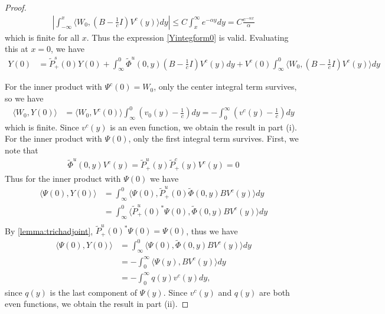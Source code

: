 \documentclass[thesis.tex]{subfiles}
\begin{document}
\begin{lemma}
\begin{proof}
\begin{align*}
\left| \int_{-\infty}^x \langle W_0, \left( B - \frac{1}{c}I \right) V^c(y) \rangle dy \right| 
\leq C \int_x^{\infty} e^{-\alpha y} dy = C \frac{e^{-\alpha x}}{\alpha}
\end{align*}
which is finite for all $x$. Thus the expression \cref{Yintegform0} is valid. Evaluating this at $x = 0$, we have
\begin{equation}\label{Yintegform0}
\begin{aligned}
Y(0) &= \tilde{P}^s_+(0) Y(0) 
+ \int_{\infty}^0 \tilde{\Phi}^u(0,y)\left( B - \frac{1}{c}I \right) V^c(y) dy + V^c(0) \int_{\infty}^0 \langle W_0, \left( B - \frac{1}{c}I \right) V^c(y) \rangle dy 
\end{aligned}
\end{equation}

For the inner product with $\Psi^c(0) = W_0$, only the center integral term survives, so we have
\begin{align*}
\langle W_0, Y(0) \rangle
&= \langle W_0, V^c(0) \rangle \int_{\infty}^0 \left(v_0(y) - \frac{1}{c}\right) dy 
= -\int_0^{\infty} \left(v^c(y) - \frac{1}{c}\right) dy 
\end{align*}
which is finite. Since $v^c(y)$ is an even function, we obtain the result in part (i). For the inner product with $\Psi(0)$, only the first integral term survives. First, we note that 
\begin{align*}
\tilde{\Phi}^u(0,y) V^c(y) = \tilde{P}_+^u(y) \tilde{P}_+^c(y)V^c(y) = 0
\end{align*}
Thus for the inner product with $\Psi(0)$ we have
\begin{align*}
\langle \Psi(0), Y(0) \rangle
&= \int_{\infty}^0 \langle \Psi(0), \tilde{P}_+^u(0) \tilde{\Phi}(0,y) B V^c(y) \rangle dy \\
&= \int_{\infty}^0 \langle \tilde{P}_+^u(0)^*\Psi(0), \tilde{\Phi}(0,y) B V^c(y) \rangle dy \\
\end{align*}
By \cref{lemma:trichadjoint}, $\tilde{P}_+^u(0)^*\Psi(0) = \Psi(0)$, thus we have
\begin{align*}
\langle \Psi(0), Y(0) \rangle
&= \int_{\infty}^0 \langle \Psi(0), \tilde{\Phi}(0,y) B V^c(y) \rangle dy \\
&= -\int_0^\infty \langle \Psi(y), B V^c(y) \rangle dy \\
&=-\int_0^\infty q(y) v^c(y) dy,
\end{align*}
since $q(y)$ is the last component of $\Psi(y)$. Since $v^c(y)$ and $q(y)$ are both even functions, we obtain the result in part (ii).
\end{proof}
\end{lemma}
\end{document}
